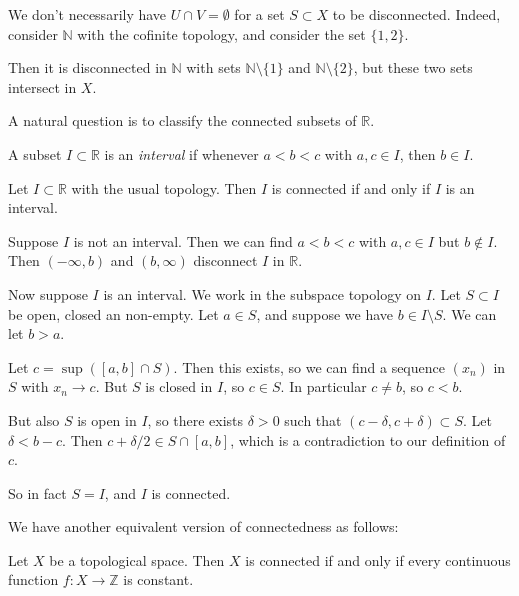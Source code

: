 \documentclass[12pt]{article}
\begin{document}
\begin{example}
	We don't necessarily have $U \cap V = \emptyset$ for a set $S \subset X$ to be disconnected. Indeed, consider $\mathbb{N}$ with the cofinite topology, and consider the set $\{1, 2\}$.

	Then it is disconnected in $\mathbb{N}$ with sets $\mathbb{N} \setminus \{1\}$ and $\mathbb{N} \setminus \{2\}$, but these two sets intersect in $X$.
\end{example}

A natural question is to classify the connected subsets of $\mathbb{R}$.

\begin{definition}
	A subset $I \subset \mathbb{R}$ is an \textit{interval} if whenever $a < b < c$ with $a, c \in I$, then $b \in I$.
\end{definition}

\begin{proposition}
	Let $I \subset \mathbb{R}$ with the usual topology. Then $I$ is connected if and only if $I$ is an interval.
\end{proposition}

\begin{proofbox}
	Suppose $I$ is not an interval. Then we can find $a < b < c$ with $a, c \in I$ but $b \not \in I$. Then $(-\infty, b)$ and $(b, \infty)$ disconnect $I$ in $\mathbb{R}$.

	Now suppose $I$ is an interval. We work in the subspace topology on $I$. Let $S \subset I$ be open, closed an non-empty. Let $a \in S$, and suppose we have $b \in I \setminus S$. We can let $b > a$.

	Let $c = \sup ([a, b] \cap S)$. Then this exists, so we can find a sequence $(x_n)$ in $S$ with $x_n \to c$. But $S$ is closed in $I$, so $c \in S$. In particular $c \neq b$, so $c < b$.

	But also $S$ is open in $I$, so there exists $\delta > 0$ such that $(c - \delta, c + \delta) \subset S$. Let $\delta < b - c$. Then $c + \delta/2 \in S \cap [a, b]$, which is a contradiction to our definition of $c$.

	So in fact $S = I$, and $I$ is connected.
\end{proofbox}

We have another equivalent version of connectedness as follows:

\begin{theorem}
	Let $X$ be a topological space. Then $X$ is connected if and only if every continuous function $f : X \to \mathbb{Z}$ is constant.
\end{theorem}
\end{document}
